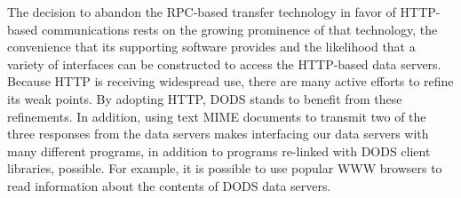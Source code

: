 The decision to abandon the RPC-based transfer technology in favor of
HTTP-based communications rests on the growing prominence of that technology,
the convenience that its supporting software provides and the likelihood
that a variety of interfaces can be constructed to access the HTTP-based data
servers. Because HTTP is receiving widespread use, there are many active
efforts to refine its weak points. By adopting HTTP, DODS stands to benefit
from these refinements. In addition, using text MIME documents to transmit
two of the three responses from the data servers makes interfacing our data
servers with many different programs, in addition to programs re-linked with
DODS client libraries, possible. For example, it is possible to use popular
WWW browsers to read information about the contents of DODS data servers.









